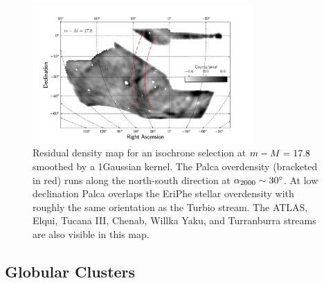 \documentclass[twocolumn]{aastex61}
\begin{document}
\begin{figure}
  \centering
  \includegraphics[width=0.75\textwidth]{palca_mbtpq_17p8.pdf}
  \caption{Residual density map for an isochrone selection at $m - M = 17.8$ smoothed by a 1\degree Gaussian kernel. 
The Palca overdensity (bracketed in red) runs along the north-south direction at ${\alpha_{2000}} \sim 30{}^{\circ}$. 
At low declination Palca overlaps the EriPhe stellar overdensity with roughly the same orientation as the Turbio stream.
The ATLAS, Elqui, Tucana III, Chenab, Willka Yaku, and Turranburra streams are also visible in this map.
 \label{fig:palca}
  }
\end{figure}

\subsection{Globular Clusters}
\end{document}
